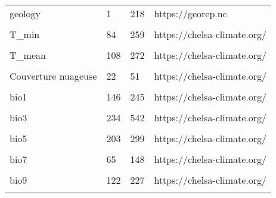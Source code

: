 \documentclass[
]{article}
\begin{document}
\begin{table}
{\begin{tabular}{l|l|l|l}
\hline
\cellcolor{gray!6}{WDPA} & \cellcolor{gray!6}{1} & \cellcolor{gray!6}{1} & \cellcolor{gray!6}{https://www.protectedplanet.net/en}\\
\hline
geology & 1 & 218 & https://georep.nc\\
\hline
\cellcolor{gray!6}{peridotites} & \cellcolor{gray!6}{0} & \cellcolor{gray!6}{1} & \cellcolor{gray!6}{https://georep.nc}\\
\hline
T\_min & 84 & 259 & https://chelsa-climate.org/\\
\hline
\cellcolor{gray!6}{T\_max} & \cellcolor{gray!6}{129} & \cellcolor{gray!6}{299} & \cellcolor{gray!6}{https://chelsa-climate.org/}\\
\hline
T\_mean & 108 & 272 & https://chelsa-climate.org/\\
\hline
\cellcolor{gray!6}{prec} & \cellcolor{gray!6}{26} & \cellcolor{gray!6}{509} & \cellcolor{gray!6}{https://chelsa-climate.org/}\\
\hline
Couverture nuageuse & 22 & 51 & https://chelsa-climate.org/\\
\hline
\cellcolor{gray!6}{PET\_penman} & \cellcolor{gray!6}{45} & \cellcolor{gray!6}{211} & \cellcolor{gray!6}{https://chelsa-climate.org/}\\
\hline
bio1 & 146 & 245 & https://chelsa-climate.org/\\
\hline
\cellcolor{gray!6}{bio2} & \cellcolor{gray!6}{15} & \cellcolor{gray!6}{79} & \cellcolor{gray!6}{https://chelsa-climate.org/}\\
\hline
bio3 & 234 & 542 & https://chelsa-climate.org/\\
\hline
\cellcolor{gray!6}{bio4} & \cellcolor{gray!6}{1739} & \cellcolor{gray!6}{2637} & \cellcolor{gray!6}{https://chelsa-climate.org/}\\
\hline
bio5 & 203 & 299 & https://chelsa-climate.org/\\
\hline
\cellcolor{gray!6}{bio6} & \cellcolor{gray!6}{84} & \cellcolor{gray!6}{210} & \cellcolor{gray!6}{https://chelsa-climate.org/}\\
\hline
bio7 & 65 & 148 & https://chelsa-climate.org/\\
\hline
\cellcolor{gray!6}{bio8} & \cellcolor{gray!6}{178} & \cellcolor{gray!6}{269} & \cellcolor{gray!6}{https://chelsa-climate.org/}\\
\hline
bio9 & 122 & 227 & https://chelsa-climate.org/\\
\hline
\cellcolor{gray!6}{bio10} & \cellcolor{gray!6}{178} & \cellcolor{gray!6}{269} & \cellcolor{gray!6}{https://chelsa-climate.org/}\\

\end{tabular}}
\end{table}
\end{document}
